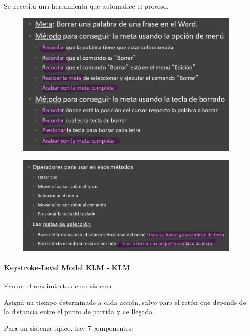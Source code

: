\documentclass[12pt, twoside, openright]{report} %
\begin{document}
          Se necesita una herramienta que automatice el proceso.
        \begin{figure}[H]
          {\includegraphics[scale=.3]{Untitled 31.png}}
        \end{figure}
        \begin{figure}[H]
          {\includegraphics[scale=.25]{Untitled 32.png}}
        \end{figure}
        \pagebreak
\paragraph{Keystroke-Level Model KLM - KLM} 
Evalúa el rendimiento de un sistema.


          Asigna un tiempo determinado a cada acción, salvo para el
          ratón que depende de la distancia entre el punto de partida y
          de llegada.

          Para un sistema típico, hay 7 componentes:
\end{document}
